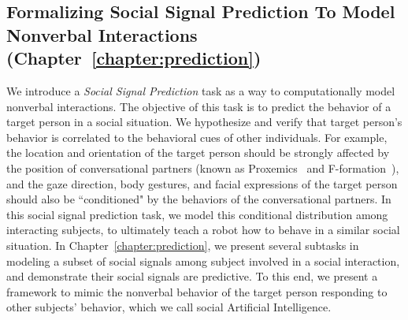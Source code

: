 \subsection{Formalizing Social Signal Prediction To Model Nonverbal Interactions  (Chapter~\ref{chapter:prediction})}

We introduce a \emph{Social Signal Prediction} task as a way to computationally model nonverbal interactions. The objective of this task is to predict the behavior of a target person in a social situation. We hypothesize and verify that target person's behavior is correlated to the behavioral cues of other individuals. For example, the location and orientation of the target person should be strongly affected by the position of conversational partners (known as Proxemics~\cite{Hall66} and F-formation~\cite{kendon90}), and the gaze direction, body gestures, and facial expressions of the target person should also be ``conditioned" by the behaviors of the conversational partners. In this social signal prediction task, we model this conditional distribution among interacting subjects, to ultimately teach a robot how to behave in a similar social situation. In Chapter~\ref{chapter:prediction}, we present several subtasks in modeling a subset of social signals among subject involved in a social interaction, and demonstrate their social signals are predictive. To this end, we present a framework to mimic the nonverbal behavior of the target person responding to other subjects' behavior, which we call social Artificial Intelligence. 



